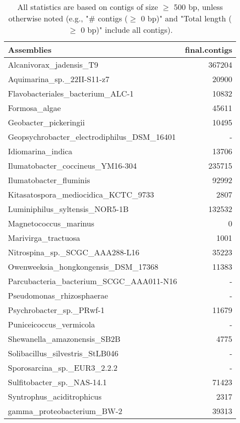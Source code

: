 \documentclass[12pt,a4paper]{article}
\begin{document}
\begin{table}[ht]
\begin{center}
\caption{All statistics are based on contigs of size $\geq$ 500 bp, unless otherwise noted (e.g., "\# contigs ($\geq$ 0 bp)" and "Total length ($\geq$ 0 bp)" include all contigs).}
\begin{tabular}{|l*{1}{|r}|}
\hline
Assemblies & final.contigs \\ \hline
Alcanivorax\_jadensis\_T9 & 367204 \\ \hline
Aquimarina\_sp.\_22II-S11-z7 & 20900 \\ \hline
Flavobacteriales\_bacterium\_ALC-1 & 10832 \\ \hline
Formosa\_algae & 45611 \\ \hline
Geobacter\_pickeringii & 10495 \\ \hline
Geopsychrobacter\_electrodiphilus\_DSM\_16401 & - \\ \hline
Idiomarina\_indica & 13706 \\ \hline
Ilumatobacter\_coccineus\_YM16-304 & 235715 \\ \hline
Ilumatobacter\_fluminis & 92992 \\ \hline
Kitasatospora\_mediocidica\_KCTC\_9733 & 2807 \\ \hline
Luminiphilus\_syltensis\_NOR5-1B & 132532 \\ \hline
Magnetococcus\_marinus & 0 \\ \hline
Marivirga\_tractuosa & 1001 \\ \hline
Nitrospina\_sp.\_SCGC\_AAA288-L16 & 35223 \\ \hline
Owenweeksia\_hongkongensis\_DSM\_17368 & 11383 \\ \hline
Parcubacteria\_bacterium\_SCGC\_AAA011-N16 & - \\ \hline
Pseudomonas\_rhizosphaerae & - \\ \hline
Psychrobacter\_sp.\_PRwf-1 & 11679 \\ \hline
Puniceicoccus\_vermicola & - \\ \hline
Shewanella\_amazonensis\_SB2B & 4775 \\ \hline
Solibacillus\_silvestris\_StLB046 & - \\ \hline
Sporosarcina\_sp.\_EUR3\_2.2.2 & - \\ \hline
Sulfitobacter\_sp.\_NAS-14.1 & 71423 \\ \hline
Syntrophus\_aciditrophicus & 2317 \\ \hline
gamma\_proteobacterium\_BW-2 & 39313 \\ \hline
\end{tabular}
\end{center}
\end{table}
\end{document}
